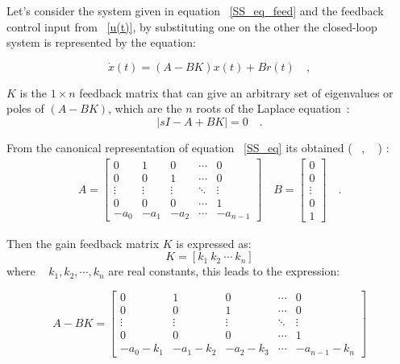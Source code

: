 Let's consider the system given in equation ~\ref{SS_eq_feed} and the feedback control input from ~\ref{u(t)}, by substituting one on the other the closed-loop system is represented by the equation:

\begin{equation}
	\dot{x}(t)=(A-BK)x(t) + Br(t)	\quad ,
\end{equation}

 $K$ is the $1\times n$ feedback matrix that can give an arbitrary set of eigenvalues or poles of $(A-BK)$, which are the $n$ roots of the Laplace equation~\cite[Chapter~10]{Golnaraghi2010}:
\begin{equation}
	|sI-A+BK|=0 \quad.
\end{equation}

 From the canonical representation of equation ~\ref{SS_eq} its obtained (~\cite[Chapter~10]{Golnaraghi2010} , ~\cite[Chapter~4]{Chen1999} ) :
 \begin{align}
 A=\begin{bmatrix}
 0& 1& 0 & \cdots & 0\\
 0 & 0 & 1 & \cdots & 0\\
 \vdots & \vdots & \vdots &\ddots & \vdots \\
 0 & 0 & 0 & \cdots & 1 \\
 -a_0 & -a_1 & -a_2 & \cdots & -a_{n-1}
 \end{bmatrix} \quad
 B=\begin{bmatrix}
 0 \\ 0 \\ \vdots \\ 0 \\ 1
 \end{bmatrix} \quad .
 \end{align}

Then the gain feedback matrix $K$ is expressed as:
\begin{equation}
K= [k_1~k_2~\cdots ~ k_n]
\end{equation}
 where ~ $k_1,k_2,\cdots,k_n$ are real constants, this leads to the expression:
 
 \begin{equation}
 A-BK=\begin{bmatrix}
 0& 1& 0 & \cdots & 0\\
 0 & 0 & 1 & \cdots & 0\\
 \vdots & \vdots & \vdots &\ddots & \vdots \\
 0 & 0 & 0 & \cdots & 1 \\
  -a_0-k_1 & -a_1-k_2 & -a_2-k_3 & \cdots & -a_{n-1}-k_n
 \end{bmatrix}
 \end{equation}
 
